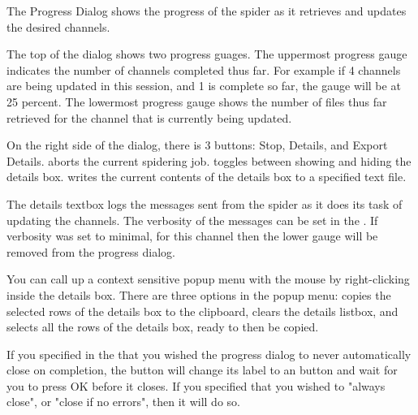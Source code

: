 The Progress Dialog shows the progress of the \brandingapplicationsuitename spider as it retrieves 
and updates the desired channels. 

The top of the dialog shows two progress guages. The uppermost progress gauge 
indicates the number of channels completed thus far. For example if 4 channels 
are being updated in this session, and 1 is complete so far, the gauge will be
at 25 percent. The lowermost progress gauge shows the number of files thus 
far retrieved for the channel that is currently being updated.

On the right side of the dialog, there is 3 buttons: Stop, Details, and Export Details.
 aborts the current spidering job. 
 toggles between showing and hiding the details box. 
 writes the current contents of the details 
box to a specified text file.

The details textbox logs the messages sent from the spider as it does its task 
of updating the channels. The verbosity of the messages can be set in 
the 
\helpignore{\ref{sec:pd-preferences-dialog}}
. If verbosity 
was set to minimal, for this channel then the lower gauge will be removed from 
the progress dialog.

You can call up a context sensitive popup menu with the mouse by right-clicking
inside the details box. There are three options in the popup menu: 
 copies the selected rows of the details box 
to the clipboard,  clears the details listbox, and 
 selects all the rows of the details box, ready to 
then be copied.


If you specified in the 
\helpignore{\ref{sec:pd-preferences-dialog}} 
that you wished the progress dialog to never automatically close on completion, 
the  button will change its label to an 
 button and wait for you to press OK before it closes. If 
you specified that you wished to "always close", or "close if no errors", then 
it will do so.

